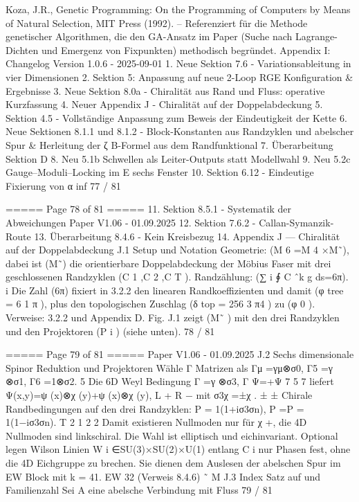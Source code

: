 \begin{MyVerbatim}
{{Koza, J.R., Genetic Programming: On the Programming of Computers by Means of Natural Selection, MIT Press
(1992). – Referenziert für die Methode genetischer Algorithmen, die den GA-Ansatz im Paper (Suche nach Lagrange-
Dichten und Emergenz von Fixpunkten) methodisch begründet.
Appendix I: Changelog
Version 1.0.6 - 2025-09-01
1. Neue Sektion 7.6 - Variationsableitung in vier Dimensionen
2. Sektion 5: Anpassung auf neue 2-Loop RGE Konfiguration & Ergebnisse
3. Neue Sektion 8.0a - Chiralität aus Rand und Fluss: operative Kurzfassung
4. Neuer Appendix J - Chiralität auf der Doppelabdeckung
5. Sektion 4.5 - Vollständige Anpassung zum Beweis der Eindeutigkeit der Kette
6. Neue Sektionen 8.1.1 und 8.1.2 - Block-Konstanten aus Randzyklen und abelscher Spur & Herleitung der ζ B-Formel
aus dem Randfunktional
7. Überarbeitung Sektion D
8. Neu 5.1b Schwellen als Leiter-Outputs statt Modellwahl
9. Neu 5.2c Gauge–Moduli–Locking im E sechs Fenster
10. Sektion 6.12 - Eindeutige Fixierung von α inf
77 / 81

===== Page 78 of 81 =====
11. Sektion 8.5.1 - Systematik der Abweichungen
Paper V1.06 - 01.09.2025
12. Sektion 7.6.2 - Callan-Symanzik-Route
13. Überarbeitung 8.4.6 - Kein Kreisbezug
14.
Appendix J — Chiralität auf der Doppelabdeckung
J.1 Setup und Notation
Geometrie: (M 6 =M 4 ×M˜), dabei ist (M˜) die orientierbare Doppelabdeckung der Möbius Faser mit drei
geschlossenen Randzyklen (C 1 ,C 2 ,C T ).
Randzählung: (∑ i ∮ C ˆk g ds=6π).
i
Die Zahl (6π) fixiert in 3.2.2 den linearen Randkoeffizienten und damit (φ tree = 6 1 π ), plus den topologischen Zuschlag
(δ top = 256 3 π4 ) zu (φ 0 ). Verweise: 3.2.2 und Appendix D.
Fig. J.1 zeigt (M˜ ) mit den drei Randzyklen und den Projektoren (P i ) (siehe unten).
78 / 81

===== Page 79 of 81 =====
Paper V1.06 - 01.09.2025
J.2 Sechs dimensionale Spinor Reduktion und Projektoren
Wähle Γ Matrizen als
Γμ =γμ⊗σ0, Γ5 =γ ⊗σ1, Γ6 =1⊗σ2.
5
Die 6D Weyl Bedingung
Γ =γ ⊗σ3, Γ Ψ=+Ψ
7 5 7
liefert
Ψ(x,y)=ψ (x)⊗χ (y)+ψ (x)⊗χ (y),
L + R −
mit
σ3χ =±χ .
± ±
Chirale Randbedingungen auf den drei Randzyklen:
P = 1(1+iσ3σn), P =P = 1(1−iσ3σn).
T 2 1 2 2
Damit existieren Nullmoden nur für χ +, die 4D Nullmoden sind linkschiral.
Die Wahl ist elliptisch und eichinvariant.
Optional legen Wilson Linien W i ∈SU(3)×SU(2)×U(1) entlang C i nur Phasen fest, ohne die 4D Eichgruppe zu
brechen.
Sie dienen dem Auslesen der abelschen Spur im EW Block mit
k = 41.
EW 32
(Verweis 8.4.6)
˜
M
J.3 Index Satz auf und Familienzahl
Sei A eine abelsche Verbindung mit Fluss
79 / 81

}}
\end{MyVerbatim}
